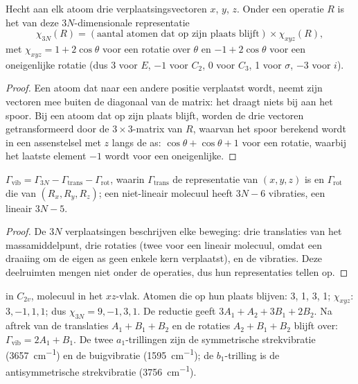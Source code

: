\begin{proposition}\label{prop:b3:group-theory-applied:gamma-3n}
Hecht aan elk atoom drie verplaatsingsvectoren $x$, $y$, $z$. Onder een
operatie $R$ is het  van deze $3N$-dimensionale representatie
\[
\chi_{3N}(R) = (\text{aantal atomen dat op zijn plaats blijft}) \times \chi_{xyz}(R),
\]
met $\chi_{xyz} = 1 + 2\cos\theta$ voor een rotatie over $\theta$ en $-1 + 2\cos\theta$
voor een oneigenlijke rotatie (dus 3 voor $E$, $-1$ voor $C_2$, 0 voor $C_3$, 1 voor $\sigma$,
$-3$ voor $i$).
\end{proposition}

\begin{proof}
Een atoom dat naar een andere positie verplaatst wordt, neemt zijn
vectoren mee buiten de diagonaal van de matrix: het draagt niets bij aan
het spoor. Bij een atoom dat op zijn plaats blijft, worden de drie
vectoren getransformeerd door de $3\times3$-matrix van $R$, waarvan het
spoor berekend wordt in een assenstelsel met $z$ langs de as: $\cos\theta + \cos\theta + 1$ voor een
rotatie, waarbij het laatste element $-1$ wordt voor een oneigenlijke.
\end{proof}

\begin{proposition}\label{prop:b3:group-theory-applied:mode-count}
$\Gamma_{\mathrm{vib}} = \Gamma_{3N} - \Gamma_{\mathrm{trans}} - \Gamma_{\mathrm{rot}}$, waarin
$\Gamma_{\mathrm{trans}}$ de representatie van $(x, y, z)$ is en $\Gamma_{\mathrm{rot}}$ die
van $(R_x, R_y, R_z)$; een niet-lineair molecuul heeft $3N - 6$ vibraties,
een lineair
$3N - 5$.
\end{proposition}

\begin{proof}
De $3N$ verplaatsingen beschrijven elke beweging: drie translaties van het
massamiddelpunt, drie rotaties (twee voor een lineair molecuul, omdat een
draaiing om de eigen as geen enkele kern verplaatst), en de vibraties.
Deze deelruimten mengen niet onder de operaties, dus hun representaties
tellen op.
\end{proof}

\begin{example}[Water]\label{ex:b3:group-theory-applied:water}
 in $C_{2v}$, molecuul in het $xz$-vlak. Atomen die op hun plaats
blijven: 3, 1, 3, 1;
$\chi_{xyz}$: $3, -1, 1, 1$; dus $\chi_{3N} = 9, -1, 3, 1$. De reductie geeft $3A_1 +
A_2 + 3B_1 + 2B_2$. Na aftrek van de translaties $A_1 + B_1 + B_2$ en de
rotaties $A_2 + B_1 + B_2$ blijft
over: $\Gamma_{\mathrm{vib}} = 2A_1 + B_1$. De twee $a_1$-trillingen zijn de
symmetrische strekvibratie (\qty{3657}{cm^{-1}}) en de buigvibratie
(\qty{1595}{cm^{-1}}); de $b_1$-trilling is de antisymmetrische
strekvibratie (\qty{3756}{cm^{-1}}).
\end{example}

